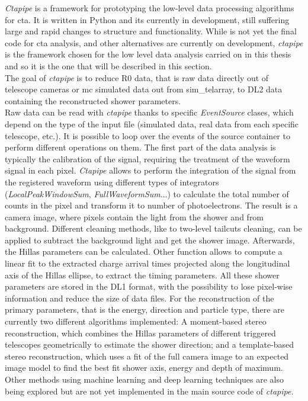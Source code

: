 \documentclass[main.tex]{subfiles}
\begin{document}
\textit{Ctapipe} \cite{ctapipe} is a framework for prototyping the low-level data processing algorithms for \gls{cta}. It is written in Python and its currently in development, still suffering large and rapid changes to structure and functionality. While is not yet the final code for \gls{cta} analysis, and other alternatives are currently on development, \textit{ctapipe} is the framework chosen for the low level data analysis carried on in this thesis and so it is the one that will be described in this section.\\
The goal of \textit{ctapipe} is to reduce R0 data, that is raw data directly out of telescope cameras or \gls{mc} simulated data out from sim\_telarray, to DL2 data containing the reconstructed shower parameters.\\
Raw data can be read with \textit{ctapipe} thanks to specific \textit{EventSource} clases, which depend on the type of the input file (simulated data, real data from each specific telescope, etc.). It is possible to loop over the events of the source container to perform different operations on them. The first part of the data analysis is typically the calibration of the signal, requiring the treatment of the waveform signal in each pixel. \textit{Ctapipe} allows to perform the integration of the signal from the registered waveform using different types of integrators (\textit{LocalPeakWindowSum}, \textit{FullWaveformSum}...) to calculate the total number of counts in the pixel and transform it to number of photoelectrons. The result is a camera image, where pixels contain the light from the shower and from background. Different cleaning methods, like to two-level tailcuts cleaning, can be applied to subtract the background light and get the shower image. Afterwards, the Hillas parameters can be calculated. Other function allows to compute a linear fit to the extracted charge arrival times projected along the longitudinal axis of the Hillas ellipse, to extract the timing parameters. All these shower parameters are stored in the DL1 format, with the possibility to lose pixel-wise information and reduce the size of data files. For the reconstruction of the primary parameters, that is the energy, direction and particle type, there are currently two different algorithms implemented: A moment-based stereo reconstruction, which combines the Hillas parameters of different triggered telescopes geometrically to estimate the shower direction; and a template-based stereo reconstruction, which uses a fit of the full camera image to an expected image model to find the best fit shower axis, energy and depth of maximum. Other methods using machine learning and deep learning techniques are also being explored but are not yet implemented in the main source code of \textit{ctapipe.}\\
\end{document}
